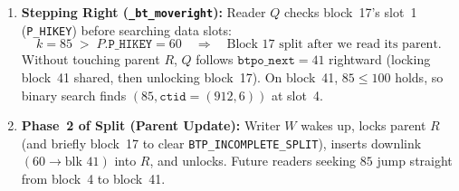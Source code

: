 \begin{enumerate}
  \item \textbf{Stepping Right (\texttt{\_bt\_moveright}):} Reader $Q$ checks block~17's slot~1 (\texttt{P\_HIKEY}) before searching data slots:
  \[
    k = 85 \;>\; P.\texttt{P\_HIKEY} = 60 \quad\Longrightarrow\quad \text{Block~17 split after we read its parent.}
  \]
  Without touching parent $R$, $Q$ follows $\texttt{btpo\_next} = 41$ rightward (locking block~41 shared, then unlocking block~17). On block~41, $85 \le 100$ holds, so binary search finds $(85, \texttt{ctid}=(912, 6))$ at slot~4.

  \item \textbf{Phase~2 of Split (Parent Update):} Writer $W$ wakes up, locks parent $R$ (and briefly block~17 to clear \texttt{BTP\_INCOMPLETE\_SPLIT}), inserts downlink $(60 \to \text{blk } 41)$ into $R$, and unlocks. Future readers seeking $85$ jump straight from block~4 to block~41.
\end{enumerate}

